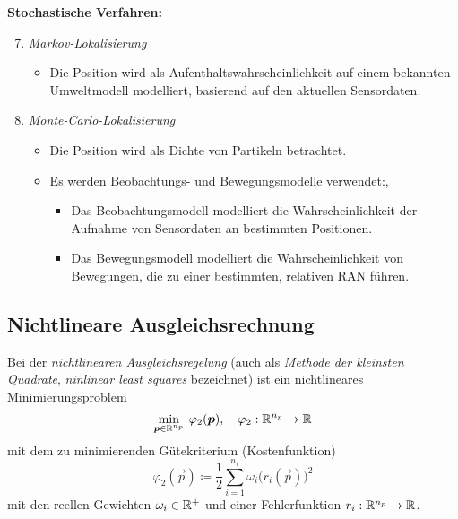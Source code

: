 		\textbf{Stochastische Verfahren:}
		\begin{enumerate} \setcounter{enumi}{6}
			\item \emph{Markov-Lokalisierung}
				\begin{itemize}
					\item Die Position wird als Aufenthaltswahrscheinlichkeit auf einem bekannten Umweltmodell modelliert, basierend auf den aktuellen Sensordaten.
				\end{itemize}
			\item \emph{Monte-Carlo-Lokalisierung}
				\begin{itemize}
					\item Die Position wird als Dichte von Partikeln betrachtet.
					\item Es werden Beobachtungs- und Bewegungsmodelle verwendet:,
						\begin{itemize}
							\item Das Beobachtungsmodell modelliert die Wahrscheinlichkeit der Aufnahme von Sensordaten an bestimmten Positionen.
							\item Das Bewegungsmodell modelliert die Wahrscheinlichkeit von Bewegungen, die zu einer bestimmten, relativen RAN führen.
						\end{itemize}
				\end{itemize}
		\end{enumerate}

		\subsection{Nichtlineare Ausgleichsrechnung}
			\label{sec:leastsquares}

			Bei der \emph{nichtlinearen Ausgleichsregelung} (auch als \emph{Methode der kleinsten Quadrate}, \emph{ninlinear least squares} bezeichnet) ist ein nichtlineares Minimierungsproblem
			\begin{equation*}
				\min_{\bm{p} \in \mathbb{R}^{n_p}} \> \varphi_2(\bm{p}),\quad \varphi_2 : \mathbb{R}^{n_p} \to \mathbb{R}
			\end{equation*}
			mit dem zu minimierenden Gütekriterium (Kostenfunktion)
			\begin{equation*}
				\varphi_2(\vec{p}) \coloneqq \frac{1}{2} \sum_{i = 1}^{n_r} \omega_i \big(r_i(\vec{p})\big)^2
			\end{equation*}
			mit den reellen Gewichten \( \omega_i \in \mathbb{R}^+ \) und einer Fehlerfunktion \( r_i : \mathbb{R}^{n_p} \to \mathbb{R} \).

